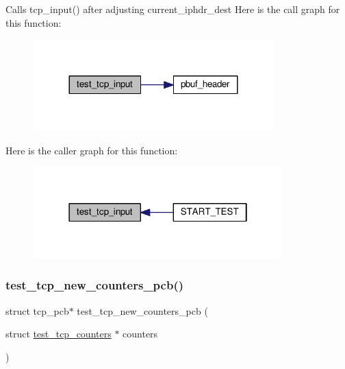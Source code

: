 Calls tcp\+\_\+input() after adjusting current\+\_\+iphdr\+\_\+dest Here is the call graph for this function\+:
\nopagebreak
\begin{figure}[H]
\begin{center}
\leavevmode
\includegraphics[width=264pt]{openmote-cc2538_2lwip_2test_2unit_2tcp_2tcp__helper_8h_a310f0aa8ac7ce26d35fd91c69ff98bda_cgraph}
\end{center}
\end{figure}
Here is the caller graph for this function\+:
\nopagebreak
\begin{figure}[H]
\begin{center}
\leavevmode
\includegraphics[width=274pt]{openmote-cc2538_2lwip_2test_2unit_2tcp_2tcp__helper_8h_a310f0aa8ac7ce26d35fd91c69ff98bda_icgraph}
\end{center}
\end{figure}
\mbox{\label{openmote-cc2538_2lwip_2test_2unit_2tcp_2tcp__helper_8h_a4743f4d8687063a2fc6da6d448cfcdcf}} 
\subsubsection{\texorpdfstring{test\+\_\+tcp\+\_\+new\+\_\+counters\+\_\+pcb()}{test\_tcp\_new\_counters\_pcb()}}
{\footnotesize\ttfamily struct tcp\+\_\+pcb$\ast$ test\+\_\+tcp\+\_\+new\+\_\+counters\+\_\+pcb (\begin{DoxyParamCaption}\item[{struct \hyperlink{structtest__tcp__counters}{test\+\_\+tcp\+\_\+counters} $\ast$}]{counters }\end{DoxyParamCaption})}

